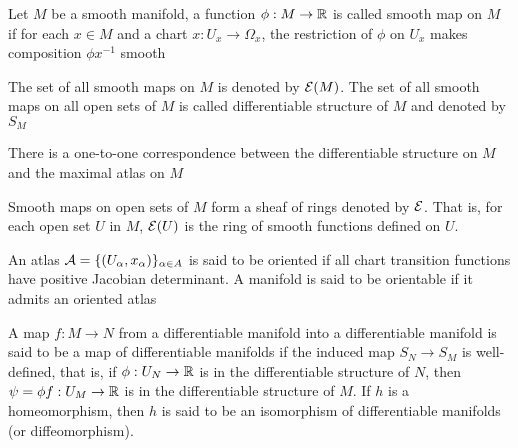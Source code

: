 \begin{definition}
	Let $M$ be a smooth manifold, a function $\phi: M \to \mathbb{R}$ is called smooth map on $M$ if for each $x \in M$ and a chart $x: U_x \to \Omega_x$, the restriction of $\phi$ on $U_x$ makes composition $\phi x^{-1}$ smooth
	
	\begin{center}
	\end{center}
	
	The set of all smooth maps on $M$ is denoted by $\mathcal{E}(M)$. The set of all smooth maps on all open sets of $M$ is called differentiable structure of $M$ and denoted by $S_M$
\end{definition}

\begin{remark}
	There is a one-to-one correspondence between the differentiable structure on $M$ and the maximal atlas on $M$
\end{remark}

\begin{remark}
	Smooth maps on open sets of $M$ form a sheaf of rings denoted by $\mathcal{E}$. That is, for each open set $U$ in $M$, $\mathcal{E}(U)$ is the ring of smooth functions defined on $U$.
\end{remark}

\begin{definition}
	An atlas $\mathcal{A} = \{(U_\alpha, x_\alpha)\}_{\alpha \in A}$ is said to be oriented if all chart transition functions have positive Jacobian determinant. A manifold is said to be orientable if it admits an oriented atlas
\end{definition}

\begin{definition}
	A map $f: M \to N$ from a differentiable manifold into a differentiable manifold is said to be a map of differentiable manifolds if the induced map $S_N \to S_M$ is well-defined, that is, if $\phi: U_N \to \mathbb{R}$ is in the differentiable structure of $N$, then $\psi = \phi f: U_M \to \mathbb{R}$ is in the differentiable structure of $M$. If $h$ is a homeomorphism, then $h$ is said to be an isomorphism of differentiable manifolds (or diffeomorphism).
	\begin{center}
	\end{center}
\end{definition}

